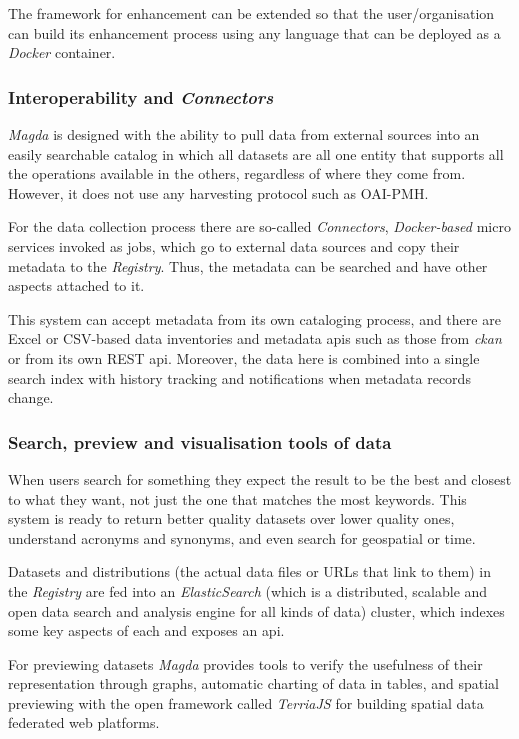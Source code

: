 The framework for enhancement can be extended so that the user/organisation can build its enhancement process using any language that can be deployed as a \textit{Docker} container.
  
\subsubsection{Interoperability and \textit{Connectors}}
  
\textit{Magda} is designed with the ability to pull data from external sources into an easily searchable catalog in which all datasets are all one entity that supports all the operations available in the others, regardless of where they come from. However, it does not use any harvesting protocol such as OAI-PMH.
  
For the data collection process there are so-called \textit{Connectors}, \textit{Docker-based} micro services invoked as jobs, which go to external data sources and copy their metadata to the \textit{Registry}. Thus, the metadata can be searched and have other aspects attached to it. 
  
This system can accept metadata from its own cataloging process, and there are Excel or CSV-based data inventories and metadata \gls{api}s such as those from \textit{\gls{ckan}} or from its own REST \gls{api}. Moreover, the data here is combined into a single search index with history tracking and notifications when metadata records change.

\subsubsection{Search, preview and visualisation tools of data}
  
When users search for something they expect the result to be the best and closest to what they want, not just the one that matches the most keywords. This system is ready to return better quality datasets over lower quality ones, understand acronyms and synonyms, and even search for geospatial or time.
  
Datasets and distributions (the actual data files or URLs that link to them) in the \textit{Registry} are fed into an \textit{ElasticSearch} (which is a distributed, scalable and open data search and analysis engine for all kinds of data) cluster, which indexes some key aspects of each and exposes an \gls{api}.

For previewing datasets \textit{Magda} provides tools to verify the usefulness of their representation through graphs, automatic charting of data in tables, and spatial previewing with the open framework called \textit{TerriaJS} for building spatial data federated web platforms.  
  
